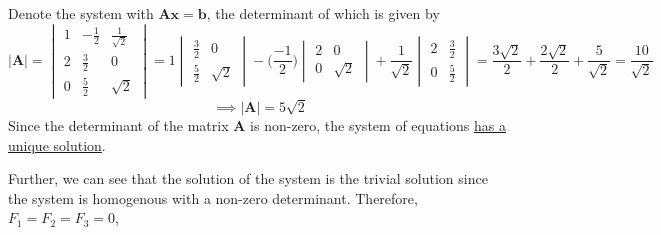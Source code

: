 Denote the system with \( \mathbf{A}\mathbf{x} = \mathbf{b} \), the determinant of which is given by
\[
    \left| \mathbf{A} \right| = \begin{vmatrix} 1 & -\frac{1}{2} & \frac{1}{\sqrt{2}} \\ 2 & \frac{3}{2} & 0 \\ 0 & \frac{5}{2} & \sqrt{2} \end{vmatrix}
    = 1 \begin{vmatrix} \frac{3}{2} & 0 \\ \frac{5}{2} & \sqrt{2} \end{vmatrix} - \Big(\frac{-1}{2}\Big) \begin{vmatrix} 2 & 0 \\ 0 & \sqrt{2} \end{vmatrix} + \frac{1}{\sqrt{2}} \begin{vmatrix} 2 & \frac{3}{2} \\ 0 & \frac{5}{2} \end{vmatrix}
    =\frac{3\sqrt{2}}{2} + \frac{2\sqrt{2}}{2} + \frac{5}{\sqrt{2}}
    = \frac{10}{\sqrt{2}}
\]
\[
    \implies \left| \mathbf{A} \right| = 5 \sqrt{2}
\]
Since the determinant of the matrix \( \mathbf{A} \) is non-zero, the system of equations \underline{has a unique solution}.

Further, we can see that the solution of the system is the trivial solution since the system is homogenous with a non-zero determinant.
Therefore, \( F_1 = F_2 = F_3 = 0 \),
